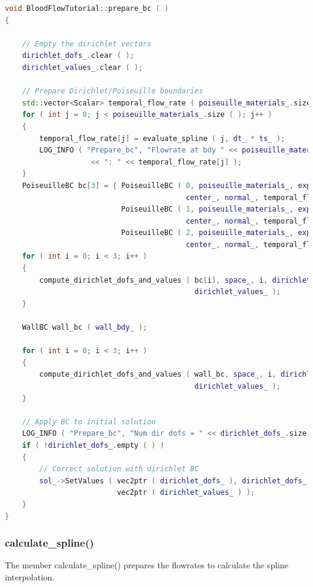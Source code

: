 \documentclass[a4paper, 11pt, twoside]{article}
\begin{document}
\begin{lstlisting}[language=C++, basicstyle={\footnotesize, \ttfamily}, keywordstyle=\color{blue},  numbers=none, tabsize=4]
void BloodFlowTutorial::prepare_bc ( )
{

    // Empty the dirichlet vectors
    dirichlet_dofs_.clear ( );
    dirichlet_values_.clear ( );

    // Prepare Dirichlet/Poiseuille boundaries
    std::vector<Scalar> temporal_flow_rate ( poiseuille_materials_.size ( ) );
    for ( int j = 0; j < poiseuille_materials_.size ( ); j++ )
    {
        temporal_flow_rate[j] = evaluate_spline ( j, dt_ * ts_ );
        LOG_INFO ( "Prepare_bc", "Flowrate at bdy " << poiseuille_materials_[j] 
                    << ": " << temporal_flow_rate[j] );
    }
    PoiseuilleBC bc[3] = { PoiseuilleBC ( 0, poiseuille_materials_, exponent_, radius_, 
                                          center_, normal_, temporal_flow_rate ),
                           PoiseuilleBC ( 1, poiseuille_materials_, exponent_, radius_,
                                          center_, normal_, temporal_flow_rate ),
                           PoiseuilleBC ( 2, poiseuille_materials_, exponent_, radius_, 
                                          center_, normal_, temporal_flow_rate ) };
    for ( int i = 0; i < 3; i++ )
    {
        compute_dirichlet_dofs_and_values ( bc[i], space_, i, dirichlet_dofs_,
                                            dirichlet_values_ );
    }

    WallBC wall_bc ( wall_bdy_ );

    for ( int i = 0; i < 3; i++ )
    {
        compute_dirichlet_dofs_and_values ( wall_bc, space_, i, dirichlet_dofs_, 
                                            dirichlet_values_ );
    }

    // Apply BC to initial solution
    LOG_INFO ( "Prepare_bc", "Num dir dofs = " << dirichlet_dofs_.size ( ) );
    if ( !dirichlet_dofs_.empty ( ) )
    {
        // Correct solution with dirichlet BC
        sol_->SetValues ( vec2ptr ( dirichlet_dofs_ ), dirichlet_dofs_.size ( ),
                          vec2ptr ( dirichlet_values_ ) );
    }
}
\end{lstlisting}

\subsubsection{calculate\_spline()}
The member calculate\_spline() prepares the flowrates to calculate the spline interpolation.
\end{document}

